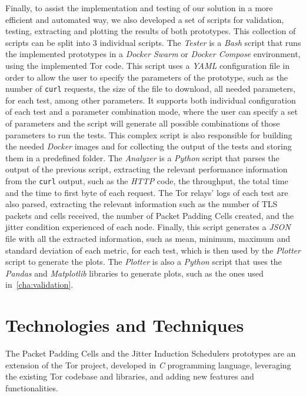 Finally, to assist the implementation and testing of our solution in a more efficient and automated way, we also developed a set of scripts for validation, testing, extracting and plotting the results of both prototypes.  
This collection of scripts can be split into 3 individual scripts.
The \textit{Tester} is a \textit{Bash} script that runs the implemented prototypes in a \textit{Docker Swarm} or \textit{Docker Compose} environment, using the implemented Tor code. This script uses a \textit{YAML} configuration file in order to allow the user to specify the parameters of the prototype, such as the number of \texttt{curl} requests, the size of the file to download, all needed parameters, for each test, among other parameters. It supports both individual configuration of each test and a parameter combination mode, where the user can specify a set of parameters and the script will generate all possible combinations of those parameters to run the tests. This complex script is also responsible for building the needed \textit{Docker} images and for collecting the output of the tests and storing them in a predefined folder.
The \textit{Analyzer} is a \textit{Python} script that parses the output of the previous script, extracting the relevant performance information from the \texttt{curl} output, such as the \textit{HTTP} code, the throughput, the total time and the time to first byte of each request. The Tor relays' logs of each test are also parsed, extracting the relevant information such as the number of TLS packets and cells received, the number of Packet Padding Cells created, and the jitter condition experienced of each node. Finally, this script generates a \textit{JSON} file with all the extracted information, such as mean, minimum, maximum and standard deviation of each metric, for each test, which is then used by the \textit{Plotter} script to generate the plots.
The \textit{Plotter} is also a \textit{Python} script that uses the \textit{Pandas} and \textit{Matplotlib} libraries to generate plots, such as the ones used in~\autoref{cha:validation}. 


\section{Technologies and Techniques}\label{sec:technologies_and_techniques}

The Packet Padding Cells and the Jitter Induction Schedulers prototypes are an extension of the Tor project, developed in \textit{C} programming language, leveraging the existing Tor codebase and libraries, and adding new features and functionalities.

